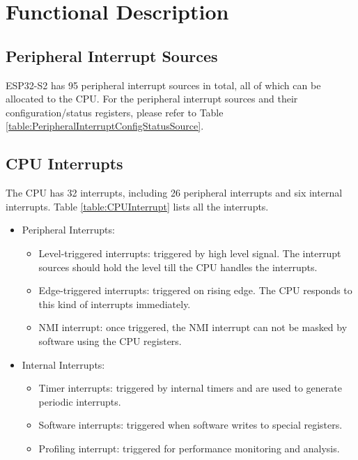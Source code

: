 \documentclass[main\_\_EN.tex]{subfiles}
\begin{document}
\section{Functional Description}

\subsection{Peripheral Interrupt Sources}

ESP32-S2 has 95 peripheral interrupt sources in total, all of which can be allocated to the CPU. For the peripheral interrupt sources and their configuration/status registers, please refer to Table \ref{table:PeripheralInterruptConfigStatusSource}.

\clearpage
\begin{landscape}


\end{landscape}
\restoregeometry

\subsection{CPU Interrupts}

The CPU has 32 interrupts, including 26 peripheral interrupts and six internal interrupts. Table \ref{table:CPUInterrupt} lists all the interrupts.

\begin{itemize}
    \item Peripheral Interrupts:
    \begin{itemize}
        \item Level-triggered interrupts: triggered by high level signal. The interrupt sources should hold the level till the CPU handles the interrupts.
        \item Edge-triggered interrupts: triggered on rising edge. The CPU responds to this kind of interrupts immediately.
        \item NMI interrupt: once triggered, the NMI interrupt can not be masked by software using the CPU registers.
    \end{itemize}
    \item Internal Interrupts:
        \begin{itemize}
        \item Timer interrupts: triggered by internal timers and are used to generate periodic interrupts.
        \item Software interrupts: triggered when software writes to special registers.
        \item Profiling interrupt: triggered for performance monitoring and analysis.
        \end{itemize}

\end{itemize}
\end{document}
